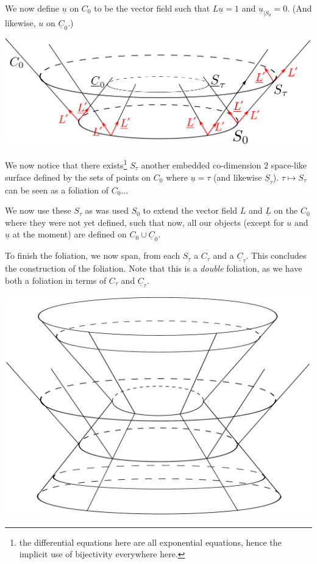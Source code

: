 \documentclass[a4paper,11pt]{article}
\numberwithin{equation}{section}
\theoremstyle{definition}
\newtheorem{comment}{Comment}
\begin{document}
We now define $\underline{u}$ on $C_0$ to be the vector field such that $L \underline{u}=1$ and $\underline{u}_{|S_0}=0$. (And likewise, $u$ on $\underline{C}_0$.)
\begin{center}
    \includegraphics [width=0.75\linewidth] {Pictures/02_VFields.png}
\end{center}

We now notice that there exists\footnote{the differential equations here are all exponential equations, hence the implicit use of bijectivity everywhere here.} $S_\tau$ another embedded co-dimension 2 space-like surface defined by the sets of points on $C_0$ where $\underline{u}=\tau$ (and likewise $\underline{S}_\tau$). $\tau\mapsto S_\tau$ can be seen as a foliation of $C_0$...

We now use these $S_\tau$ as was used $S_0$ to extend the vector field $L$ and $\underline{L}$ on the $C_0$ where they were not yet defined, such that now, all our objects (except for $u$ and $\underline{u}$ at the moment) are defined on $C_0\cup\underline{C}_0$.

To finish the foliation, we now span, from each $S_\tau$ a $C_\tau$ and a $\underline{C}_\tau$. This concludes the construction of the foliation. Note that this is a \emph{double} foliation, as we have both a foliation in terms of $C_\tau$ and $\underline{C}_\tau$.
\begin{center}
    \includegraphics [width=0.75\linewidth] {Pictures/03_Foliation.png}
\end{center}
\end{document}
